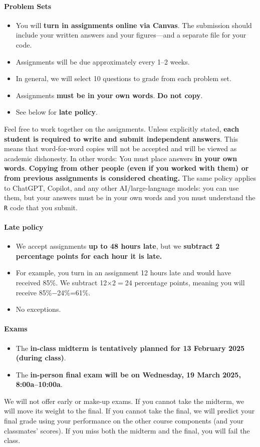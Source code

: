 \documentclass[10pt]{article}
\begin{document}
\paragraph{Problem Sets}
\begin{itemize}
  \item You will \textbf{turn in assignments online via Canvas}. The submission should include your written answers and your figures---and a separate file for your code.
  \item Assignments will be due approximately every 1--2 weeks.
  \item In general, we will select 10 questions to grade from each problem set.
  \item Assignments \textbf{must be in your own words}. \textbf{Do not copy}.
  \item See below for \textbf{late policy}.
\end{itemize}
Feel free to work together on the assignments. Unless explicitly stated, \textbf{each student is required to write and submit independent answers}. This means that word-for-word copies will not be accepted and will be viewed as academic dishonesty. In other words: You must place answers \textbf{in your own words}. \textbf{Copying from other people (even if you worked with them) or from previous assignments is considered cheating.} The same policy applies to ChatGPT, Copilot, and any other AI/large-language models: you can use them, but your answers must be in your own words and you must understand the \texttt{R} code that you submit.

\paragraph{Late policy}
\begin{itemize}
  \item We accept assignments \textbf{up to 48 hours late}, but we \textbf{subtract 2 percentage points for each hour it is late.}
  \item For example, you turn in an assignment 12 hours late and would have received 85\%. We subtract 12$\times$2$=$24 percentage points, meaning you will receive 85\%$-$24\%=61\%.
  \item No exceptions.
\end{itemize}

\paragraph{Exams}
\begin{itemize}
  \item The \textbf{in-class midterm is tentatively planned for 13 February 2025 (during class)}.
  \item The \textbf{in-person final exam will be on Wednesday, 19 March 2025, 8:00a--10:00a}.
\end{itemize}
We will not offer early or make-up exams. If you cannot take the midterm, we will move its weight to the final. If you cannot take the final, we will predict your final grade using your performance on the other course components (and your classmates' scores). If you miss both the midterm and the final, you will fail the class.
\end{document}
